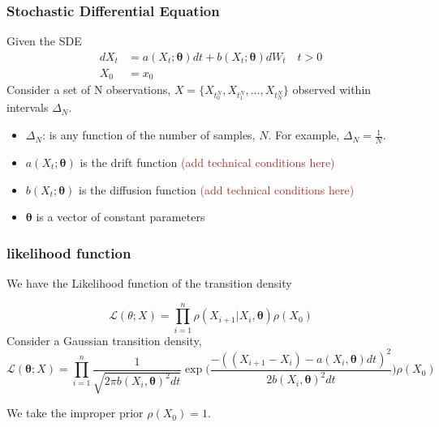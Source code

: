 \documentclass[aspectratio=169]{beamer}\usepackage[utf8]{inputenc}
\begin{document}
\begin{frame}\frametitle{ Stochastic Differential Equation }
Given the SDE
\begin{equation}
\begin{split}
dX_t &= a(X_t; \bm{\theta}) dt + b (X_t; \bm{\theta} ) dW_t \quad t > 0 \\
X_0 & = x_0
\end{split}\label{main}
\end{equation}
Consider a set of N observations, $ X=\{ X_{t_0^N} , X_{t_1^N} ,\ldots , X_{t_N^N} \}$ observed within intervals $\Delta_N$. 

\begin{itemize}
\item $\Delta_N$: is any function of the number of samples, $N$. For example, $\Delta_N = \frac{1}{N}$.
\item $a(X_t; \bm{\theta})$ is the drift function \textcolor{brown}{(add technical conditions here)}
\item $b (X_t; \bm{\theta} )$ is the diffusion function \textcolor{brown}{(add technical conditions here)}
\item $\bm{\theta}$ is a vector of constant parameters
\end{itemize}
\end{frame}

\begin{frame}\frametitle{ likelihood function }
We have the Likelihood function of the transition density

\begin{equation}
\mathcal{L}(\theta;X) = \prod\limits_{i=1}^n\rho( {X_{i+1}|X_{i}}, \bm{\theta})  \rho(X_0) 
\end{equation}
Consider a Gaussian transition density,
\begin{equation*}
\mathcal{L}(\bm{\theta}; X) = \prod\limits_{i=1}^n  \frac{1}{\sqrt{2 \pi b(X_i,\bm{\theta})^2 dt}  } \exp\Big(\frac{-((X_{i+1}-X_i) - a(X_i,\bm{\theta}) dt )^2}{2b(X_i,\bm{\theta})^2 dt}\Big) \rho(X_0)
\end{equation*}

We take the improper prior $\rho(X_0)=1$.
\end{frame}
\end{document}
